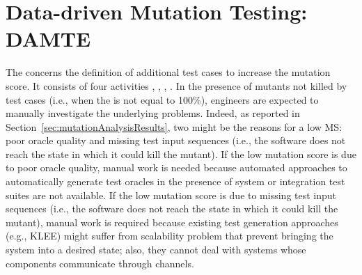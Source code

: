 



\section{Data-driven Mutation Testing: DAMTE} %
\label{sec:data:test_suite_augmentation}

\STARTCHANGEDWPT

The  concerns the definition of additional test cases to increase the mutation score.
It consists of four activities , , , . 
In the presence of mutants not killed by test cases (i.e., when the   is not equal to 100\%), engineers are expected to manually investigate the underlying problems. Indeed, as reported in Section~\ref{sec:mutationAnalysisResults}, two might be the reasons for a low MS: poor oracle quality and missing test input sequences (i.e., the software does not reach the state in which it could kill the mutant).
If the low mutation score is due to poor oracle quality, manual work is needed because automated approaches to automatically generate test oracles in the presence of system or integration test suites are not available. 
If the low mutation score is due to missing test input sequences (i.e., the software does not reach the state in which it could kill the mutant), manual work is required because existing test generation approaches (e.g., KLEE) might suffer from scalability problem that prevent bringing the system into a desired state; also, they cannot deal with systems whose components communicate through channels. 

